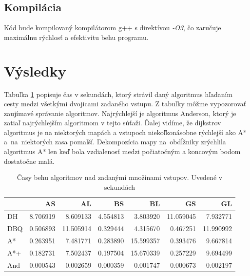 \subsection{Kompilácia}
Kód bude kompilovaný kompilátorom g++ s direktívou \emph{-O3}, čo zaručuje maximálnu rýchlosť a efektivitu behu programu.


\section{Výsledky}
Tabuľka \ref{fig:totaltime_result} popisuje čas v sekundách, ktorý strávil daný algoritmus hľadaním cesty medzi všetkými dvojicami zadaného vstupu. Z tabuľky môžme vypozorovať  zaujímavé správanie algoritmov. Najrýchlejší je 
algoritmus Anderson, ktorý je zatiaľ najrýchlejším algoritmom v tejto súťaži.
Ďalej vidíme, že dijkstrov algoritmus je na niektorých mapách a vstupoch niekoľkonásobne rýchlejší ako A* a~na~niektorých zasa pomalší.
Dekompozícia mapy na~obdĺžniky zrýchlila algoritmus A* len keď bola vzdialenosť medzi počiatočným a koncovým bodom dostatočne malá.



\begin{table}[H]
	\centering
	\begin{tabular}{|l | r|r|r|r|r|r|}
	\hline
	  & AS & AL & BS & BL & GS & GL \\
	\hline
	DH & 8.706919 & 8.609133 & 4.554813 & 3.803920 & 11.059045 & 7.932771 \\
	DBQ & 0.506893 & 11.505914 &  0.329444 & 4.315670 & 0.467251 & 11.990992 \\
	A* & 0.263951 & 7.481771 & 0.283890 & 15.599357 & 0.393476 & 9.667814 \\
	A*+  & 0.182731 & 7.502437 &  0.197504 & 15.670339 & 0.257229 & 9.694499\\
	And  &  0.000543 & 0.002659 & 0.000359 & 0.001747 & 0.000673& 0.002197\\
	\hline
	\end{tabular}
	\caption{Časy behu algoritmov nad zadanými množinami vstupov. Uvedené v sekundách}
	\label{fig:totaltime_result}
\end{table}

